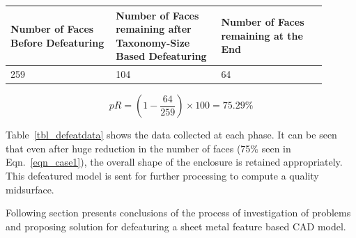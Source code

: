 \begin{minipage}[c]{0.98\linewidth}
 \label{tbl_defeatdata}
\begin{longtable}[h]{@{} p{0.3\linewidth} |p{0.3\linewidth}| p{0.3\linewidth} @{}}\toprule
\textbf{Number of Faces Before Defeaturing } & \textbf{Number of Faces {remaining} after Taxonomy-Size Based Defeaturing} & \textbf{Number of Faces {remaining} at the End}\\  \midrule
259 & 104 & 64\\
\bottomrule
\end{longtable}

\end{minipage}

\bigskip

\begin{equation}
pR = (1 - \frac{64}{259}) \times 100 = 75.29\%
\label{eqn_case1}
\end{equation}



Table~\ref{tbl_defeatdata} shows the data collected at each phase. It can be seen that even after huge reduction in the number of faces (75\% seen in Eqn.~\ref{eqn_case1}), the overall shape of the enclosure is retained appropriately. This defeatured model is sent for further processing to compute a quality midsurface.

Following section presents conclusions of the process of investigation of problems and proposing solution for defeaturing a sheet metal feature based CAD model.




